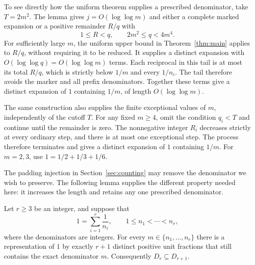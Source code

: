 To see directly how the uniform theorem supplies a prescribed denominator,
take $T=2m^2$.  The lemma gives $j=O(\log\log m)$ and either a
complete marked expansion or a positive remainder $R/q$ with
\[
  1\le R<q,\qquad 2m^2\le q<4m^4.
\]
For sufficiently large $m$, the uniform upper bound in
Theorem~\ref{thm:main} applies to $R/q$, without requiring it to be
reduced.  It supplies a distinct expansion with
$O(\log\log q)=O(\log\log m)$ terms.  Each reciprocal in this
tail is at most its total $R/q$, which is strictly below $1/m$ and
every $1/n_i$.  The tail therefore avoids the marker and all prefix
denominators.  Together these terms give a distinct expansion of $1$
containing $1/m$, of length $O(\log\log m)$.

The same construction also supplies the finite exceptional values of
$m$, independently of the cutoff $T$.  For any fixed $m\ge4$, omit the condition
$q_i<T$ and continue until the remainder is zero.  The nonnegative
integer $R_i$ decreases strictly at every ordinary step, and there is
at most one exceptional step.  The process therefore terminates and
gives a distinct expansion of $1$ containing $1/m$.  For $m=2,3$, use
$1=1/2+1/3+1/6$.

The padding injection in Section~\ref{sec:counting} may remove the
denominator we wish to preserve. The following lemma supplies the
different property needed here: it increases the length and retains
any one prescribed denominator.

\begin{lemma}
\label{lem:exact-marker-padding}
Let $r\ge3$ be an integer, and suppose that
\[
 1=\sum_{i=1}^{r}\frac1{n_i},\qquad
 1\le n_1<\cdots<n_r,
\]
where the denominators are integers. For every
$m\in\{n_1,\ldots,n_r\}$ there is a representation of $1$ by
exactly $r+1$ distinct positive unit fractions that still contains
the exact denominator $m$. Consequently $D_r\subseteq D_{r+1}$.
\end{lemma}

